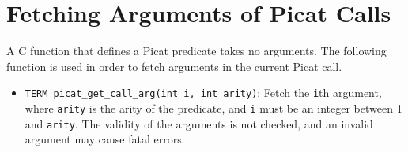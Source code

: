 \section{Fetching Arguments of Picat Calls} 
A C function that defines a Picat predicate takes no arguments. The following function is used in order to fetch arguments in the current Picat call.
\begin{itemize}
\item \texttt{TERM picat\_get\_call\_arg(int i, int arity)}: Fetch the \texttt{i}th argument, \newline where \texttt{arity} is the arity of the predicate, and \texttt{i} must be an integer between 1 and \texttt{arity}. The validity of the arguments is not checked, and an invalid argument may cause fatal errors.
\end{itemize}

